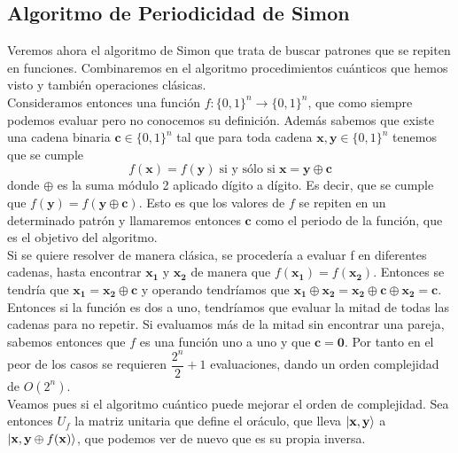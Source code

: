 \documentclass[a4paper]{article}
\numberwithin{equation}{section}
\begin{document}
\subsection{Algoritmo de Periodicidad de Simon}
Veremos ahora el algoritmo de Simon que trata de buscar patrones que se repiten en funciones. Combinaremos en el algoritmo procedimientos cuánticos que hemos visto y también operaciones clásicas.\\
\linebreak
Consideramos entonces una función $f:\{0,1\}^n \longrightarrow \{0,1\}^n$, que como siempre podemos evaluar pero no conocemos su definición. Además sabemos que existe una cadena binaria $\mathbf{c} \in \{0,1\}^n$ tal que para toda cadena $\mathbf{x},\mathbf{y}\in\{0,1\}^n$ tenemos que se cumple
\begin{equation}
f(\mathbf{x}) = f(\mathbf{y}) \; \text{si y sólo si} \; \mathbf{x} = \mathbf{y}\oplus \mathbf{c}
\end{equation}
donde $\oplus$ es la suma módulo 2 aplicado dígito a dígito. Es decir, que se cumple que $f(\mathbf{y}) = f(\mathbf{y}\oplus\mathbf{c})$. Esto es que los valores de $f$ se repiten en un determinado patrón y llamaremos entonces $\mathbf{c}$ como el periodo de la función, que es el objetivo del algoritmo.\\
\linebreak
Si se quiere resolver de manera clásica, se procedería a evaluar f en diferentes cadenas, hasta encontrar $\mathbf{x_1}$ y $\mathbf{x_2}$ de manera que $f(\mathbf{x_1}) = f(\mathbf{x_2})$. Entonces se tendría que $\mathbf{x_1} = \mathbf{x_2}\oplus \mathbf{c}$ y operando tendríamos que $\mathbf{x_1} \oplus \mathbf{x_2} = \mathbf{x_2}\oplus \mathbf{c} \oplus \mathbf{x_2} = \mathbf{c}$. Entonces si la función es dos a uno, tendríamos que evaluar la mitad de todas las cadenas para no repetir. Si evaluamos más de la mitad sin encontrar una pareja, sabemos entonces que $f$ es una función uno a uno y que $\mathbf{c} = \mathbf{0}$. Por tanto en el peor de los casos se requieren $\dfrac{2^n}{2}+1$ evaluaciones, dando un orden complejidad de $O(2^n)$.\\
\linebreak
Veamos pues si el algoritmo cuántico puede mejorar el orden de complejidad. Sea entonces $U_f$ la matriz unitaria que define el oráculo, que lleva $\ket{\mathbf{x}, \mathbf{y}}$ a $\ket{\mathbf{x}, \mathbf{y}\oplus f(\mathbf{x})}$, que podemos ver de nuevo que es su propia inversa. 
\end{document}
